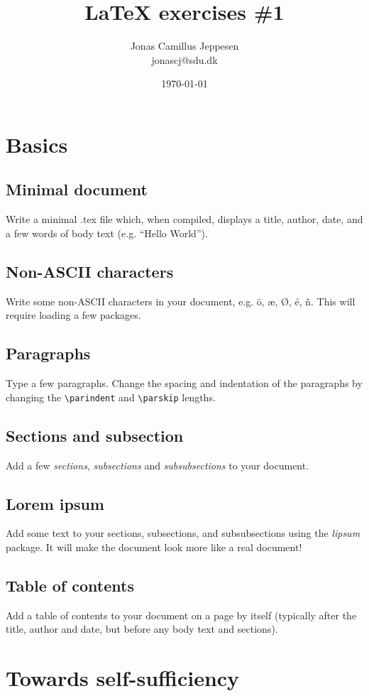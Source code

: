 \documentclass[a4paper, 12pt]{article}
\title{{\LaTeX} exercises \#1}
\author{Jonas Camillus Jeppesen \\ 
	jonascj@sdu.dk\vspace{-15pt}}
\date{\today}
\begin{document}
\maketitle
\section{Basics}
\subsection{Minimal document}
Write a minimal .tex file which, when compiled, displays a title, author, date, and a few words of body text (e.g. ``Hello World'').

\subsection{Non-ASCII characters}
Write some non-ASCII characters in your document, e.g. ö, æ, Ø, é, ñ. This will require loading a few packages.

\subsection{Paragraphs}
Type a few paragraphs. Change the spacing and indentation of the paragraphs by changing the \verb!\parindent! and \verb!\parskip! lengths.

\subsection{Sections and subsection}
Add a few \emph{sections}, \emph{subsections} and \emph{subsubsections} to your document.

\subsection{Lorem ipsum}
Add some text to your sections, subsections, and subsubsections  using the \emph{lipsum} package. It will make the document look more like a real document!

\subsection{Table of contents}
Add a table of contents to your document on a page by itself  (typically after the title, author and date, but before any body text and sections).

\section{Towards self-sufficiency}
\end{document}
